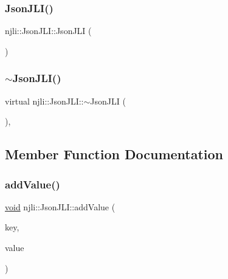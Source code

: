 \subsubsection{\texorpdfstring{Json\+J\+L\+I()}{JsonJLI()}\hspace{0.1cm}{\footnotesize\ttfamily [3/3]}}
{\footnotesize\ttfamily njli\+::\+Json\+J\+L\+I\+::\+Json\+J\+LI (\begin{DoxyParamCaption}\item[{const \mbox{\hyperlink{classnjli_1_1_json_j_l_i}{Json\+J\+LI}} \&}]{ }\end{DoxyParamCaption})\hspace{0.3cm}{\ttfamily [protected]}}

\mbox{\label{classnjli_1_1_json_j_l_i_a707b70469f3b0dcd3ee8ac4c0aebaf50}} 
\subsubsection{\texorpdfstring{$\sim$\+Json\+J\+L\+I()}{~JsonJLI()}}
{\footnotesize\ttfamily virtual njli\+::\+Json\+J\+L\+I\+::$\sim$\+Json\+J\+LI (\begin{DoxyParamCaption}{ }\end{DoxyParamCaption})\hspace{0.3cm}{\ttfamily [protected]}, {\ttfamily [virtual]}}



\subsection{Member Function Documentation}
\mbox{\label{classnjli_1_1_json_j_l_i_aab69baa38139f33c4aac4ae2836b57bd}} 
\subsubsection{\texorpdfstring{add\+Value()}{addValue()}\hspace{0.1cm}{\footnotesize\ttfamily [1/2]}}
{\footnotesize\ttfamily \mbox{\hyperlink{_thread_8h_af1e856da2e658414cb2456cb6f7ebc66}{void}} njli\+::\+Json\+J\+L\+I\+::add\+Value (\begin{DoxyParamCaption}\item[{const std\+::string \&}]{key,  }\item[{const std\+::string \&}]{value }\end{DoxyParamCaption})}

